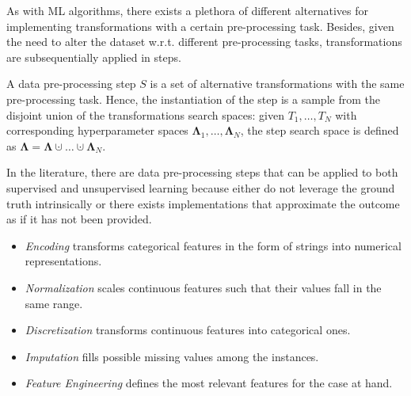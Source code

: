 As with ML algorithms, there exists a plethora of different alternatives for implementing transformations with a certain pre-processing task.
Besides, given the need to alter the dataset w.r.t. different pre-processing tasks, transformations are subsequentially applied in steps.


\begin{definition}
    A data pre-processing step $S$ is a set of alternative transformations with the same pre-processing task.
    Hence, the instantiation of the step is a sample from the disjoint union of the transformations search spaces: given $T_1, \dots, T_N$ with corresponding hyperparameter spaces $\pmb{\Lambda}_1, \dots, \pmb{\Lambda}_N$, the step search space is defined as  $\pmb{\Lambda}  = \pmb{\Lambda} \cupdot \dots \cupdot \pmb{\Lambda}_N$.
\end{definition}

In the literature, there are data pre-processing steps that can be applied to both supervised and unsupervised learning because either do not leverage the ground truth intrinsically or there exists implementations that approximate the outcome as if it has not been provided.
\begin{itemize}
    \item \textit{Encoding} transforms categorical features in the form of strings into numerical representations.
    \item \textit{Normalization} scales continuous features such that their values fall in the same range.
    \item \textit{Discretization} transforms continuous features into categorical ones.
    \item \textit{Imputation} fills possible missing values among the instances.
    \item \textit{Feature Engineering} defines the most relevant features for the case at hand.
\end{itemize}


